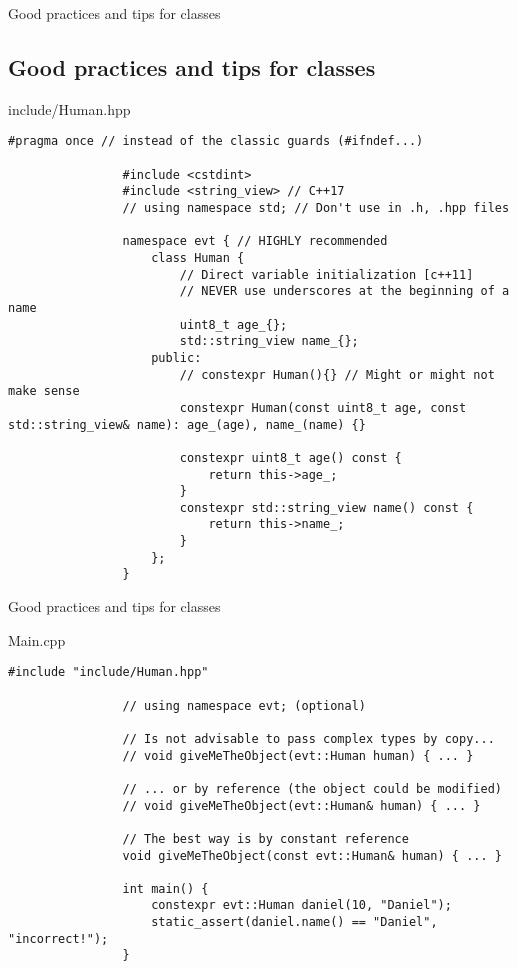 \documentclass{beamer}
\newcommand{\normalSizeItem}[1] {
  \normalsize{\item #1}
}
\newcommand{\smallCite}[1]{
	\begin{small}
		\cite{#1}	
	\end{small}
}
\begin{document}
		\begin{frame}[fragile]{Good practices and tips for classes \smallCite{cppbestpractices}}	
			\subsection{Good practices and tips for classes}
			\begin{itemize}
				\normalSizeItem { include/Human.hpp }
				\begin{lstlisting}[basicstyle={\tiny\ttfamily}]
				#pragma once // instead of the classic guards (#ifndef...)
				
				#include <cstdint>
				#include <string_view> // C++17
				// using namespace std; // Don't use in .h, .hpp files

				namespace evt { // HIGHLY recommended
					class Human {
						// Direct variable initialization [c++11]
						// NEVER use underscores at the beginning of a name
						uint8_t age_{};
						std::string_view name_{};
					public:
						// constexpr Human(){} // Might or might not make sense
						constexpr Human(const uint8_t age, const std::string_view& name): age_(age), name_(name) {}
						
						constexpr uint8_t age() const {  
							return this->age_;
						}
						constexpr std::string_view name() const { 
							return this->name_;
						}
					};
				}
				\end{lstlisting}
			\end{itemize}
		\end{frame}
		
		\begin{frame}[fragile]{Good practices and tips for classes}	
			\begin{itemize}
				\normalSizeItem { Main.cpp }
				\begin{lstlisting}[basicstyle={\tiny\ttfamily}]
				#include "include/Human.hpp"
				
				// using namespace evt; (optional)
				
				// Is not advisable to pass complex types by copy...
				// void giveMeTheObject(evt::Human human) { ... }
				
				// ... or by reference (the object could be modified)
				// void giveMeTheObject(evt::Human& human) { ... }
				
				// The best way is by constant reference
				void giveMeTheObject(const evt::Human& human) { ... }
				
				int main() {
					constexpr evt::Human daniel(10, "Daniel");
					static_assert(daniel.name() == "Daniel", "incorrect!");
				}
				\end{lstlisting}
			\end{itemize}
		\end{frame}
		
\end{document}
